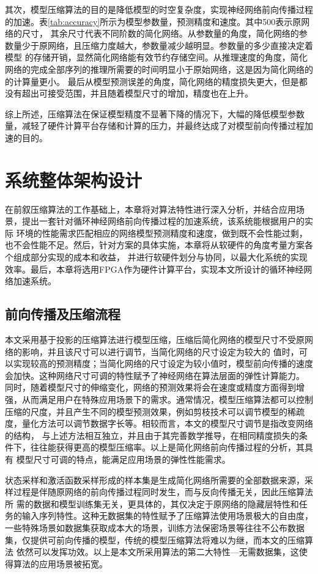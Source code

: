其次，模型压缩算法的目的是降低模型的时空复杂度，实现神经网络前向传播过程的加速。表\ref{tab:accuracy}所示为模型参数量，预测精度和速度。其中500表示原网络的尺寸，
其余尺寸代表不同阶数的简化网络。从参数量的角度，简化网络的参数量少于原网络，且压缩力度越大，参数量减少越明显。参数量的多少直接决定着模型
的存储开销，显然简化网络能有效节约存储空间。从推理速度的角度，简化网络的完成全部序列的推理所需要的时间明显小于原始网络，这是因为简化网络的的计算量更小。
最后从模型预测误差的角度，简化网络的精度损失更大，但是都没有超出可接受范围，并且随着模型尺寸的增加，精度也在上升。

综上所述，压缩算法在保证模型精度不显著下降的情况下，大幅的降低模型参数量，减轻了硬件计算平台存储和计算的压力，并最终达成了对模型前向传播过程加速的目的。

\section{系统整体架构设计}
在前叙压缩算法的工作基础上，本章将对算法特性进行深入分析，并结合应用场景，提出一套针对循环神经网络前向传播过程的加速系统，该系统能根据用户的实际
环境的性能需求匹配相应的网络模型预测精度和速度，做到既不会性能过剩，也不会性能不足。然后，针对方案的具体实施，本章将从软硬件的角度考量方案各个组成部分实现的成本和收益，
并进行软硬件划分与协同，以最大化系统的实现效率。最后，本章将选用FPGA作为硬件计算平台，实现本文所设计的循环神经网络加速系统。
\subsection{前向传播及压缩流程}
本文采用基于投影的压缩算法进行模型压缩，压缩后简化网络的模型尺寸不受原网络的影响，并且该尺寸可以进行调节，当简化网络的尺寸设定为较大的
值时，可以实现较高的预测精度；当简化网络的尺寸设定为较小值时，模型前向传播的速度会加快。这种网络尺寸可调的特性赋予了神经网络在算法层面的弹性计算能力。
同时，随着模型尺寸的伸缩变化，网络的预测效果将会在速度或精度方面得到增强，从而满足用户在特殊应用场景下的需求。通常情况，模型压缩算法都可以控制
压缩的尺度，并且产生不同的模型预测效果，例如剪枝技术可以调节模型的稀疏度，量化方法可以调节数据字长等。相较而言，本文的模型尺寸调节是指改变网络的结构，
与上述方法相互独立，并且由于其完善数学推导，在相同精度损失的条件下，往往能获得更高的模型压缩率。以上是简化网络前向传播过程的分析，其具有
模型尺寸可调的特点，能满足应用场景的弹性性能需求。

状态采样和激活函数采样形成的样本集是生成简化网络所需要的全部数据来源，采样过程是伴随原网络的前向传播过程同时发生，而与反向传播无关，因此压缩算法所
需的数据和模型训练集无关，更具体的，其仅决定于原网络的隐藏层特性和任务的输入序列特性。这种无数据集的特性赋予了压缩算法使用场景极大的自由度，
一些特殊场景如数据集获取成本大的场景，训练方法保密场景等往往不公布数据集，仅提供可前向传播的模型，传统的模型压缩算法将难以为继，而本文的压缩算法
依然可以发挥功效。以上是本文所采用算法的第二大特性---无需数据集，这使得算法的应用场景被拓宽。


